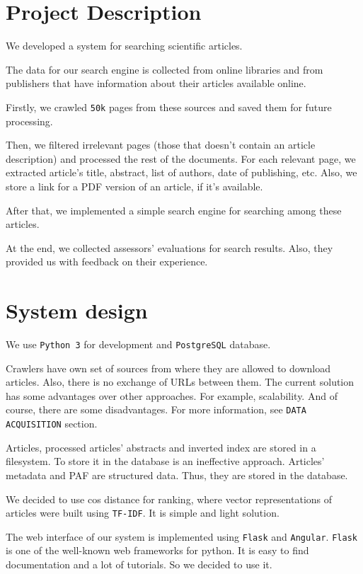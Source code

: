 \section{Project Description}

We developed a system for searching scientific articles.

The data for our search engine is collected from online libraries and from publishers that have information about their articles available online.

Firstly, we crawled \texttt{50k} pages from these sources and saved them for future processing.

Then, we filtered irrelevant pages (those that doesn't contain an article description) and processed the rest of the documents.
For each relevant page, we extracted article's title, abstract, list of authors, date of publishing, etc.
Also, we store a link for a PDF version of an article, if it's available.

After that, we implemented a simple search engine for searching among these articles. 

At the end, we collected assessors' evaluations for search results. 
Also, they provided us with feedback on their experience.

\section{System design}
We use \texttt{Python 3}  for development and \texttt{PostgreSQL} database.

Crawlers have own set of sources from where they are allowed to download articles. Also, there is no exchange of URLs between them. The current solution has some advantages over other approaches. For example, scalability. And of course, there are some disadvantages. For more information, see \texttt{DATA ACQUISITION} section.

Articles, processed articles' abstracts and inverted index are stored in a filesystem. To store it in the database is an ineffective approach.
Articles' metadata and PAF are structured data. Thus, they are stored in the database.

We decided to use cos distance for ranking, where vector representations of  articles were built using \texttt{TF-IDF}. It is simple and light solution.

The web interface of our system is implemented using \texttt{Flask} and \texttt{Angular}. \texttt{Flask} is one of the well-known web frameworks for python. It is easy to find documentation and a lot of tutorials. So we decided to use it. 

